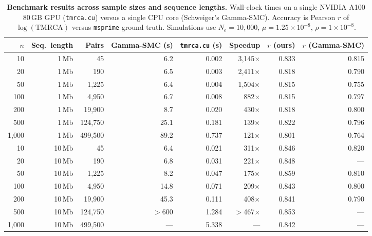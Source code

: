\documentclass[10pt,letterpaper]{article}
\begin{document}
\begin{table}[!ht]
\centering
\caption{\textbf{Benchmark results across sample sizes and sequence lengths.}
Wall-clock times on a single NVIDIA A100 80\,GB GPU (\texttt{tmrca.cu}) versus a single CPU core (Schweiger's Gamma-SMC).
Accuracy is Pearson $r$ of $\log(\text{TMRCA})$ versus \texttt{msprime} ground truth.
Simulations use $N_e = 10{,}000$, $\mu = 1.25 \times 10^{-8}$, $\rho = 1 \times 10^{-8}$.}
\label{tab:benchmarks}
\begin{tabular}{rrrrrrrr}
\toprule
$n$ & Seq.\ length & Pairs & Gamma-SMC (s) & \texttt{tmrca.cu} (s) & Speedup & $r$ (ours) & $r$ (Gamma-SMC) \\
\midrule
10 & 1\,Mb & 45 & 6.2 & 0.002 & 3{,}145$\times$ & 0.833 & 0.815 \\
20 & 1\,Mb & 190 & 6.5 & 0.003 & 2{,}411$\times$ & 0.818 & 0.790 \\
50 & 1\,Mb & 1{,}225 & 6.4 & 0.004 & 1{,}504$\times$ & 0.815 & 0.755 \\
100 & 1\,Mb & 4{,}950 & 6.7 & 0.008 & 882$\times$ & 0.815 & 0.797 \\
200 & 1\,Mb & 19{,}900 & 8.7 & 0.020 & 430$\times$ & 0.818 & 0.800 \\
500 & 1\,Mb & 124{,}750 & 25.1 & 0.181 & 139$\times$ & 0.822 & 0.796 \\
1{,}000 & 1\,Mb & 499{,}500 & 89.2 & 0.737 & 121$\times$ & 0.801 & 0.764 \\
\midrule
10 & 10\,Mb & 45 & 6.4 & 0.021 & 311$\times$ & 0.846 & 0.820 \\
20 & 10\,Mb & 190 & 6.8 & 0.031 & 221$\times$ & 0.848 & --- \\
50 & 10\,Mb & 1{,}225 & 8.2 & 0.047 & 175$\times$ & 0.859 & 0.810 \\
100 & 10\,Mb & 4{,}950 & 14.8 & 0.071 & 209$\times$ & 0.843 & 0.800 \\
200 & 10\,Mb & 19{,}900 & 45.3 & 0.111 & 408$\times$ & 0.841 & 0.790 \\
500 & 10\,Mb & 124{,}750 & $>$600 & 1.284 & $>$467$\times$ & 0.853 & --- \\
1{,}000 & 10\,Mb & 499{,}500 & --- & 5.338 & --- & 0.842 & --- \\
\bottomrule
\end{tabular}
\end{table}
\end{document}
